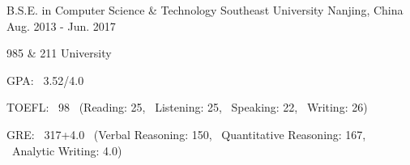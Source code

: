 

\begin{cventries}

  \cventry
    {B.S.E. in Computer Science \& Technology} %
    {Southeast University} %
    {Nanjing, China} %
    {Aug. 2013 - Jun. 2017} %
    {
      \begin{cvitems} %
        \item {985 \& 211 University}
        \item {GPA: \ 3.52/4.0} 
        \item {TOEFL: \ 98 \  (Reading: 25, \ Listening: 25, \ Speaking: 22, \ Writing: 26)}
        \item {GRE: \ 317+4.0 \ (Verbal Reasoning: 150, \ Quantitative Reasoning: 167, \ Analytic Writing: 4.0)}
      \end{cvitems} 
    }
    
\end{cventries}